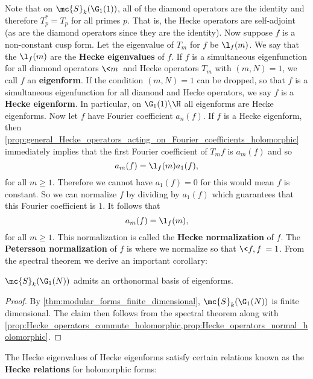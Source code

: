     Note that on $\mc{S}_{k}(\G_{1}(1))$, all of the diamond operators are the identity and therefore $T_{p}^{\ast} = T_{p}$ for all primes $p$. That is, the Hecke operators are self-adjoint (as are the diamond operators since they are the identity). Now suppose $f$ is a non-constant cusp form. Let the eigenvalue of $T_{m}$ for $f$ be $\l_{f}(m)$. We say that the $\l_{f}(m)$ are the \textbf{Hecke eigenvalues} of $f$. If $f$ is a simultaneous eigenfunction for all diamond operators $\<m\>$ and Hecke operators $T_{m}$ with $(m,N) = 1$, we call $f$ an \textbf{eigenform}. If the condition $(m,N) = 1$ can be dropped, so that $f$ is a simultaneous eigenfunction for all diamond and Hecke operators, we say $f$ is a \textbf{Hecke eigenform}. In particular, on $\G_{1}(1)\backslash\H$ all eigenforms are Hecke eigenforms. Now let $f$ have Fourier coefficient $a_{n}(f)$. If $f$ is a Hecke eigenform, then \cref{prop:general_Hecke_operators_acting_on_Fourier_coefficients_holomorphic} immediately implies that the first Fourier coefficient of $T_{m}f$ is $a_{m}(f)$ and so
    \[
      a_{m}(f) = \l_{f}(m)a_{1}(f),
    \]
    for all $m \ge 1$. Therefore we cannot have $a_{1}(f) = 0$ for this would mean $f$ is constant. So we can normalize $f$ by dividing by $a_{1}(f)$ which guarantees that this Fourier coefficient is $1$. It follows that
    \[
      a_{m}(f) = \l_{f}(m),
    \]
    for all $m \ge 1$. This normalization is called the \textbf{Hecke normalization} of $f$. The \textbf{Petersson normalization} of $f$ is where we normalize so that $\<f,f\> = 1$. From the spectral theorem we derive an important corollary:

    \begin{theorem}\label{thm:eigenforms_forms_spectral_theory_holomorphic}
      $\mc{S}_{k}(\G_{1}(N))$ admits an orthonormal basis of eigenforms.
    \end{theorem}
    \begin{proof}
      By \cref{thm:modular_forms_finite_dimensional}, $\mc{S}_{k}(\G_{1}(N))$ is finite dimensional. The claim then follows from the spectral theorem along with \cref{prop:Hecke_operators_commute_holomorphic,prop:Hecke_operators_normal_holomorphic}.
    \end{proof}

    The Hecke eigenvalues of Hecke eigenforms satisfy certain relations known as the \textbf{Hecke relations} for holomorphic forms:

